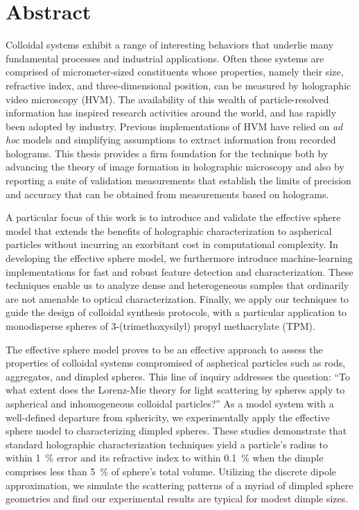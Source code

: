 \chapter*{Abstract}
\label{ch:abstract}


{
\fancyhf{}
}


Colloidal systems exhibit a range of interesting behaviors that
underlie many fundamental processes and industrial applications.
Often these systems are comprised of
micrometer-sized constituents whose properties, namely their
size, refractive index, and three-dimensional position, can be measured
by holographic video microscopy (HVM).
The availability of this wealth of particle-resolved information
has inspired research activities around the world, and has rapidly
been adopted by industry.
Previous implementations of HVM have relied on \emph{ad hoc}
models and simplifying assumptions to extract information from
recorded holograms.
This thesis provides a firm foundation for the technique both by
advancing the theory of image formation in holographic microscopy
and also by reporting a suite of validation measurements
that establish the limits of precision and accuracy that can be
obtained from measurements based on holograms.

A particular focus of this work is to introduce and validate
the effective sphere model that extends the benefits of holographic
characterization to aspherical particles without incurring
an exorbitant cost in computational complexity.
In developing the effective sphere model, we furthermore 
introduce machine-learning implementations for fast and robust feature
detection and characterization.  These techniques enable us to
analyze dense and heterogeneous samples that ordinarily are
not amenable to optical characterization.
Finally, we apply our techniques to guide the design of colloidal
synthesis protocols, with a particular application to 
monodisperse spheres of 3-(trimethoxysilyl) propyl methacrylate
(TPM).

The effective sphere model proves to be an effective approach
to assess the properties of colloidal
systems compromised of aspherical particles such as rods,
aggregates, and dimpled spheres.
This line of inquiry addresses the question:
``To what extent does the Lorenz-Mie theory for light scattering
by spheres apply to aspherical and inhomogeneous colloidal particles?''
As a model system with a well-defined departure from sphericity,
we experimentally apply the effective sphere model to
characterizing dimpled spheres.
These studies demonstrate that standard holographic characterization
techniques yield a particle's radius to within \SI{1}{\percent} error
and its refractive index to within \SI{0.1}{\percent}
when the dimple comprises less than \SI{5}{\percent} of sphere's total volume.
Utilizing the discrete dipole
approximation, we simulate the scattering patterns of a myriad of
dimpled sphere geometries and find our experimental results are
typical for modest dimple sizes.

